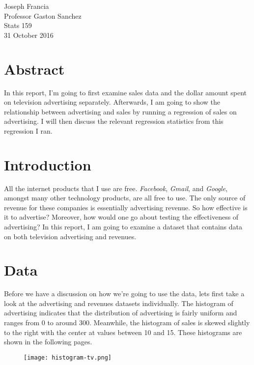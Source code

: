 \documentclass{article}
\begin{document}


Joseph Francia \\  
Professor Gaston Sanchez \\ 
Stats 159  \\
31 October 2016 \\  

\section{Abstract}

In this report, I'm going to first examine sales data and the dollar amount spent on television advertising separately. Afterwards, I am going to show the relationship between advertising and sales by running a regression of sales on advertising. I will then discuss the relevant regression statistics from this regression I ran.  

\section{Introduction}

All the internet products that I use are free. \emph{Facebook}, \emph{Gmail}, and \emph{Google}, amongst many other technology products, are all free to use. The only source of revenue for these companies is essentially advertising revenue. So how effective is it to advertise? Moreover, how would one go about testing the effectiveness of advertising? In this report, I am going to examine a dataset that contains data on both television advertising and revenues.

\section{Data}

Before we have a discussion on how we're going to use the data, lets first take a look at the advertising and revenues datasets individually. The histogram of advertising indicates that the distribution of advertising is fairly uniform and ranges from 0 to around 300. Meanwhile, the histogram of sales is skewed slightly to the right with the center at values between 10 and 15. These histograms are shown in the following pages. 


\graphicspath{ {../../stat159-fall2016-hw02/images/} }
\begin{figure}
\texttt{[image: histogram-tv.png]}
\end{figure}
\end{document}
